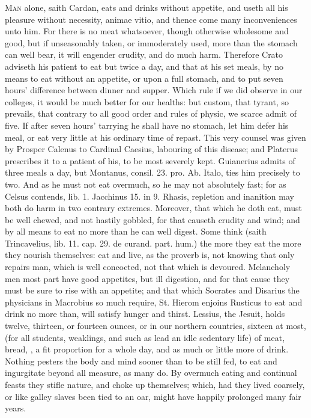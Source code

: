 {\lettrine{M}{an} alone, saith Cardan, eats and drinks without appetite, and
useth all his pleasure without necessity, animae vitio, and thence come
many inconveniences unto him. For there is no meat whatsoever, though
otherwise wholesome and good, but if unseasonably taken, or
immoderately used, more than the stomach can well bear, it will
engender crudity, and do much harm. Therefore Crato adviseth his
patient to eat but twice a day, and that at his set meals, by no means
to eat without an appetite, or upon a full stomach, and to put seven
hours' difference between dinner and supper. Which rule if we did
observe in our colleges, it would be much better for our healths: but
custom, that tyrant, so prevails, that contrary to all good order and
rules of physic, we scarce admit of five. If after seven hours'
tarrying he shall have no stomach, let him defer his meal, or eat very
little at his ordinary time of repast. This very counsel was given by
Prosper Calenus to Cardinal Caesius, labouring of this disease; and
 Platerus prescribes it to a patient of his, to be most severely
kept. Guianerius admits of three meals a day, but Montanus, consil. 23.
pro. Ab. Italo, ties him precisely to two. And as he must not eat
overmuch, so he may not absolutely fast; for as Celsus contends, lib.
1. Jacchinus 15. in 9. Rhasis, repletion and inanition may both
do harm in two contrary extremes. Moreover, that which he doth eat,
must be well chewed, and not hastily gobbled, for that causeth
crudity and wind; and by all means to eat no more than he can well
digest. Some think (saith  Trincavelius, lib. 11. cap. 29. de
curand. part. hum.) the more they eat the more they nourish themselves:
eat and live, as the proverb is, not knowing that only repairs man,
which is well concocted, not that which is devoured. Melancholy men
most part have good appetites, but ill digestion, and for that
cause they must be sure to rise with an appetite; and that which
Socrates and Disarius the physicians in Macrobius so much
require, St. Hierom enjoins Rusticus to eat and drink no more than,
will satisfy hunger and thirst. Lessius, the Jesuit, holds
twelve, thirteen, or fourteen ounces, or in our northern countries,
sixteen at most, (for all students, weaklings, and such as lead an idle
sedentary life) of meat, bread, \etc{}, a fit proportion for a whole day,
and as much or little more of drink. Nothing pesters the body and mind
sooner than to be still fed, to eat and ingurgitate beyond all measure,
as many do.  By overmuch eating and continual feasts they stifle
nature, and choke up themselves; which, had they lived coarsely, or
like galley slaves been tied to an oar, might have happily prolonged
many fair years.

}
